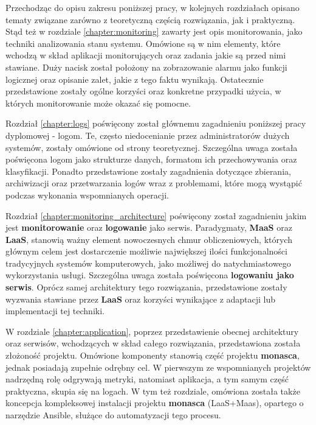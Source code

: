 Przechodząc do opisu zakresu poniższej pracy, w kolejnych rozdziałach opisano tematy związane zarówno z teoretyczną częścią rozwiązania, jak i praktyczną. Stąd też w rozdziale \ref{chapter:monitoring} zawarty jest opis monitorowania, jako techniki
analizowania stanu systemu. Omówione są w nim elementy, które wchodzą w skład aplikacji
monitorujących oraz zadania jakie są przed nimi stawiane. Duży nacisk został położony
na zobrazowanie alarmu jako funkcji logicznej oraz opisanie zalet, jakie z tego faktu
wynikają. Ostatecznie przedstawione zostały ogólne korzyści oraz konkretne przypadki użycia,
w których monitorowanie może okazać się pomocne.

Rozdział \ref{chapter:logs} poświęcony został głównemu zagadnieniu poniższej pracy dyplomowej - logom.
Te, często niedocenianie przez administratorów dużych systemów, zostały omówione od strony teoretycznej. Szczególna uwaga 
została poświęcona logom jako strukturze danych, formatom ich przechowywania oraz klasyfikacji. Ponadto przedstawione zostały 
zagadnienia dotyczące zbierania, archiwizacji oraz przetwarzania logów wraz z problemami, które mogą wystąpić 
podczas wykonania wspomnianych operacji.

Rozdział \ref{chapter:monitoring_architecture} poświęcony został zagadnieniu jakim jest
\textbf{monitorowanie} oraz \textbf{logowanie} jako serwis. Paradygmaty, \textbf{MaaS} oraz \textbf{LaaS}, stanowią ważny 
element nowoczesnych chmur obliczeniowych, których głównym celem jest dostarczenie możliwie największej ilości 
funkcjonalności tradycyjnych systemów komputerowych, jako możliwej do natychmiastowego wykorzystania usługi. Szczególna uwaga 
została poświęcona \textbf{logowaniu jako serwis}. Oprócz samej architektury tego rozwiązania, przedstawione zostały wyzwania 
stawiane przez \textbf{LaaS} oraz korzyści wynikające z adaptacji lub implementacji tej techniki.


W rozdziale \ref{chapter:application}, poprzez przedstawienie obecnej architektury oraz serwisów, wchodzących w skład całego 
rozwiązania, przedstawiona została złożoność projektu. Omówione komponenty stanowią część projektu \textbf{monasca}, jednak
posiadają zupełnie odrębny cel. W pierwszym ze wspomnianych projektów nadrzędną rolę odgrywają metryki, natomiast
aplikacja, a tym samym część praktyczna, skupia się na logach. W tym też rozdziale, omówiona została także
koncepcja kompleksowej instalacji projektu \textbf{monasca} (LaaS+Maas), opartego o narzędzie Ansible, 
służące do automatyzacji tego procesu.

